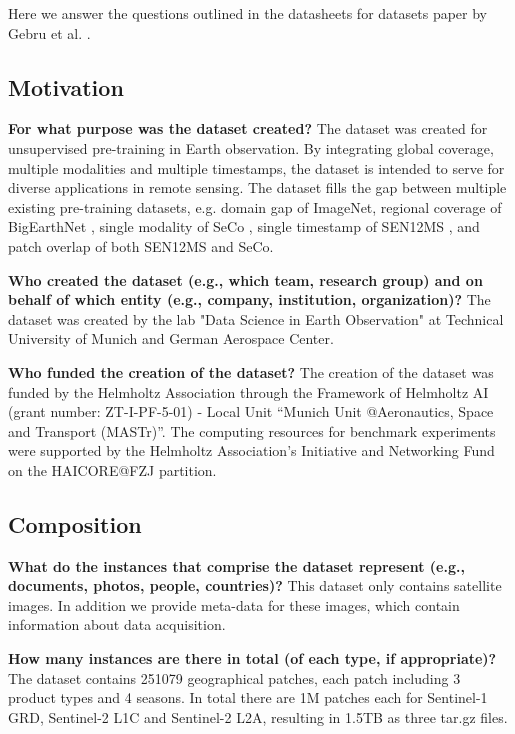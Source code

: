 \documentclass[lettersize,journal]{IEEEtran}
\begin{document}
\vspace{1em}
Here we answer the questions outlined in the datasheets for datasets paper by Gebru et al. \cite{gebru2021datasheets}.

\subsection{Motivation}

\textbf{For what purpose was the dataset created?} The dataset was created for unsupervised pre-training in Earth observation. By integrating global coverage, multiple modalities and multiple timestamps, the dataset is intended to serve for diverse applications in remote sensing. The dataset fills the gap between multiple existing pre-training datasets, e.g. domain gap of ImageNet, regional coverage of BigEarthNet \cite{sumbul2019bigearthnet}, single modality of SeCo \cite{manas2021seasonal}, single timestamp of SEN12MS \cite{Schmitt2019}, and patch overlap of both SEN12MS and SeCo.  



\textbf{Who created the dataset (e.g., which team, research group) and on behalf of which entity (e.g.,
company, institution, organization)?} The dataset was created by the lab "Data Science in Earth Observation" at Technical University of Munich and German Aerospace Center.

\textbf{Who funded the creation of the dataset?} The creation of the dataset was funded by the Helmholtz Association through the Framework of Helmholtz AI (grant number: ZT-I-PF-5-01) - Local Unit “Munich Unit @Aeronautics, Space and Transport (MASTr)”. The computing resources for benchmark experiments were supported by the Helmholtz Association's Initiative and Networking Fund on the HAICORE@FZJ partition.

\subsection{Composition}

\textbf{What do the instances that comprise the dataset represent (e.g., documents, photos, people, countries)?} This dataset only contains satellite images. In addition we provide meta-data for these images, which contain information about data acquisition.

\textbf{How many instances are there in total (of each type, if appropriate)?} The dataset contains 251079 geographical patches, each patch including 3 product types and 4 seasons. In total there are 1M patches each for Sentinel-1 GRD, Sentinel-2 L1C and Sentinel-2 L2A, resulting in 1.5TB as three tar.gz files.
\end{document}
